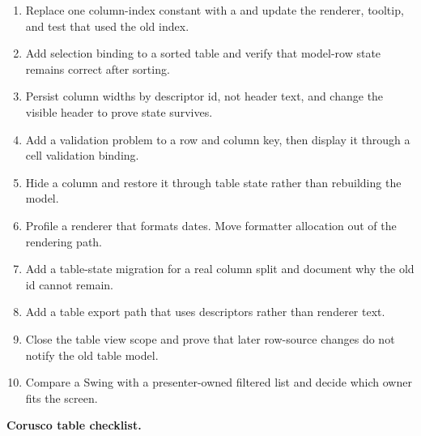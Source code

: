 \begin{exercisebox}
\begin{enumerate}
\item Replace one column-index constant with a  and update the
renderer, tooltip, and test that used the old index.
\item Add selection binding to a sorted table and verify that model-row state
remains correct after sorting.
\item Persist column widths by descriptor id, not header text, and change the
visible header to prove state survives.
\item Add a validation problem to a row and column key, then display it through
a cell validation binding.
\item Hide a column and restore it through table state rather than rebuilding
the model.
\item Profile a renderer that formats dates. Move formatter allocation out of
the rendering path.
\item Add a table-state migration for a real column split and document why the
old id cannot remain.
\item Add a table export path that uses descriptors rather than renderer text.
\item Close the table view scope and prove that later row-source changes do not
notify the old table model.
\item Compare a Swing  with a presenter-owned filtered list and
decide which owner fits the screen.
\end{enumerate}
\end{exercisebox}

\begin{center}
\textbf{Corusco table checklist.}
\end{center}

